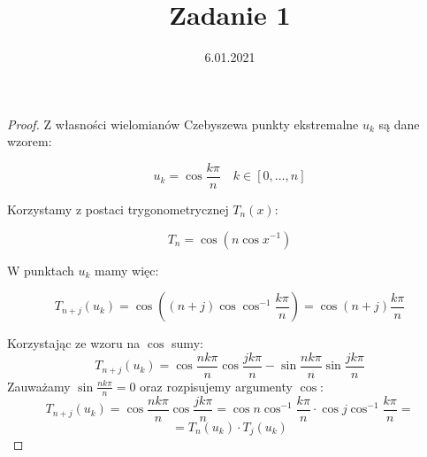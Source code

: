\documentclass{article}
\title{Zadanie 1}
\date{6.01.2021}
\begin{document}
\begin{proof}
Z własności wielomianów Czebyszewa punkty ekstremalne $u_k$ są dane wzorem: 

\begin{equation}
u_k = \cos{\frac{k\pi}{n}} \quad k \in [0,\ldots,n]
\end{equation}

Korzystamy z postaci trygonometrycznej $T_n(x)$:

\begin{equation}
T_n = \cos{(n \cos{x}^{-1})}
\end{equation}

W punktach $u_k$ mamy więc:

\begin{equation}
T_{n+j}(u_k) =  \cos{((n+j) \cos{\cos^{-1}{\frac{k\pi}{n}}})} = \cos{(n+j)\frac{k\pi}{n}}
\end{equation}

Korzystając ze wzoru na $\cos$ sumy:
$$
T_{n+j}(u_k) = \cos{\frac{nk\pi}{n}}\cos{\frac{jk\pi}{n}} -  \sin{\frac{nk\pi}{n}}\sin{\frac{jk\pi}{n}} 
$$
Zauważamy $\sin{\frac{nk\pi}{n}} = 0$ oraz rozpisujemy argumenty $\cos$:
$$
T_{n+j}(u_k) = \cos{\frac{nk\pi}{n}}\cos{\frac{jk\pi}{n}} = \cos{n \cos^{-1}{\frac{k\pi}{n}}} \cdot  \cos{j \cos^{-1}{\frac{k\pi}{n}}} = 
$$
$$
= T_n(u_k) \cdot T_j(u_k)
$$
\end{proof}
\end{document}
